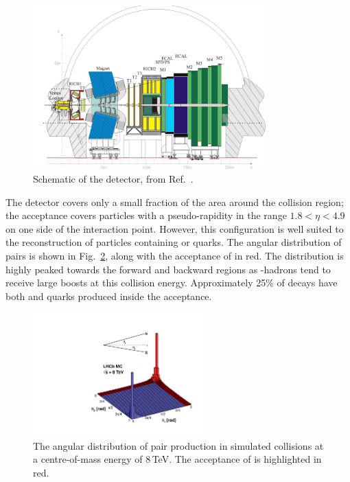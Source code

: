 \begin{figure}[!h]
    \centering
    \includegraphics[width=0.8\textwidth]{figs/Detector/LHCb_Detector_Schematic.pdf}
    \caption{Schematic of the \lhcb detector, from Ref.~\cite{Alves:2008zz}.}
    \label{fig:Dec_lhcb_Schematic}   
\end{figure}

The \lhcb detector covers only a small fraction of the area around the collision region; the acceptance covers particles with a pseudo-rapidity in the range $1.8 < \eta < 4.9$ on one side of the interaction point. However, this configuration is well suited to the reconstruction of particles containing \bquark or \bquarkbar quarks. The angular distribution of \bquark\bquarkbar pairs is shown in Fig.~\ref{fig:Dec_bb_production}, along with the acceptance of \lhcb in red. The distribution is highly peaked towards the forward and backward regions as \bquark-hadrons tend to receive large boosts at this collision energy. Approximately 25\% of decays have both \bquark and \bquarkbar quarks produced inside the acceptance.

\begin{figure}[!h]
    \centering
    \includegraphics[width=0.6\textwidth]{figs/Detector/bb_acceptance.pdf}
    \caption{The angular distribution of \bquark\bquarkbar pair production in simulated \proton \proton collisions at a centre-of-mass energy of 8\,TeV. The acceptance of \lhcb is highlighted in red.}
    \label{fig:Dec_bb_production}   
\end{figure}


